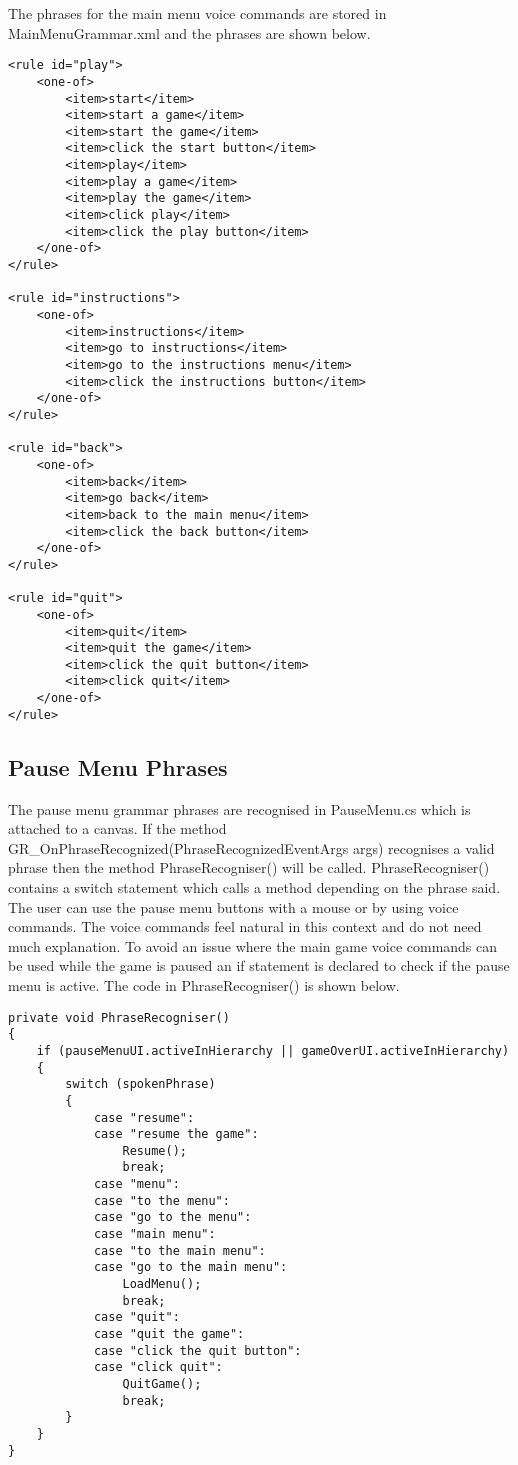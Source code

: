 \documentclass{article}
\begin{document}
The phrases for the main menu voice commands are stored in MainMenuGrammar.xml and the phrases are shown below.
\begin{verbatim}
<rule id="play">
    <one-of>
        <item>start</item>
        <item>start a game</item>
        <item>start the game</item>
        <item>click the start button</item>
        <item>play</item>
        <item>play a game</item>
        <item>play the game</item>
        <item>click play</item>
        <item>click the play button</item>
    </one-of>
</rule>

<rule id="instructions">
    <one-of>
        <item>instructions</item>
        <item>go to instructions</item>
        <item>go to the instructions menu</item>
        <item>click the instructions button</item>
    </one-of>
</rule>

<rule id="back">
    <one-of>
        <item>back</item>
        <item>go back</item>
        <item>back to the main menu</item>
        <item>click the back button</item>
    </one-of>
</rule>

<rule id="quit">
    <one-of>
        <item>quit</item>
        <item>quit the game</item>
        <item>click the quit button</item>
        <item>click quit</item>
    </one-of>
</rule>
\end{verbatim}

\subsection{Pause Menu Phrases}
The pause menu grammar phrases are recognised in PauseMenu.cs which is attached to a canvas. If the method GR\_OnPhraseRecognized(PhraseRecognizedEventArgs args) recognises a valid phrase then the method PhraseRecogniser() will be called. PhraseRecogniser() contains a switch statement which calls a method depending on the phrase said. The user can use the pause menu buttons with a mouse or by using voice commands. The voice commands feel natural in this context and do not need much explanation. To avoid an issue where the main game voice commands can be used while the game is paused an if statement is declared to check if the pause menu is active. The code in PhraseRecogniser() is shown below.
\begin{verbatim}
private void PhraseRecogniser()
{
    if (pauseMenuUI.activeInHierarchy || gameOverUI.activeInHierarchy)
    {
        switch (spokenPhrase)
        {
            case "resume":
            case "resume the game":
                Resume();
                break;
            case "menu":
            case "to the menu":
            case "go to the menu":
            case "main menu":
            case "to the main menu":
            case "go to the main menu":
                LoadMenu();
                break;
            case "quit":
            case "quit the game":
            case "click the quit button":
            case "click quit":
                QuitGame();
                break;
        }
    }
}
\end{verbatim}
\end{document}
